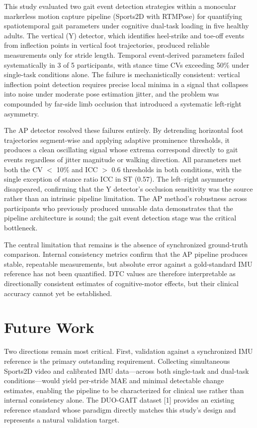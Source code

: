 \documentclass[conference]{IEEEtran}
\begin{document}
This study evaluated two gait event detection strategies within a monocular markerless motion capture pipeline (Sports2D with RTMPose) for quantifying spatiotemporal gait parameters under cognitive dual-task loading in five healthy adults. The vertical (Y) detector, which identifies heel-strike and toe-off events from inflection points in vertical foot trajectories, produced reliable measurements only for stride length. Temporal event-derived parameters failed systematically in 3 of 5 participants, with stance time CVs exceeding 50\% under single-task conditions alone. The failure is mechanistically consistent: vertical inflection point detection requires precise local minima in a signal that collapses into noise under moderate pose estimation jitter, and the problem was compounded by far-side limb occlusion that introduced a systematic left-right asymmetry.

The AP detector resolved these failures entirely. By detrending horizontal foot trajectories segment-wise and applying adaptive prominence thresholds, it produces a clean oscillating signal whose extrema correspond directly to gait events regardless of jitter magnitude or walking direction. All parameters met both the CV $<$ 10\% and ICC $>$ 0.6 thresholds in both conditions, with the single exception of stance ratio ICC in ST (0.57). The left–right asymmetry disappeared, confirming that the Y detector's occlusion sensitivity was the source rather than an intrinsic pipeline limitation. The AP method's robustness across participants who previously produced unusable data demonstrates that the pipeline architecture is sound; the gait event detection stage was the critical bottleneck.

The central limitation that remains is the absence of synchronized ground-truth comparison. Internal consistency metrics confirm that the AP pipeline produces stable, repeatable measurements, but absolute error against a gold-standard IMU reference has not been quantified. DTC values are therefore interpretable as directionally consistent estimates of cognitive-motor effects, but their clinical accuracy cannot yet be established.

\section{Future Work}

Two directions remain most critical. First, validation against a synchronized IMU reference is the primary outstanding requirement. Collecting simultaneous Sports2D video and calibrated IMU data—across both single-task and dual-task conditions—would yield per-stride MAE and minimal detectable change estimates, enabling the pipeline to be characterized for clinical use rather than internal consistency alone. The DUO-GAIT dataset [1] provides an existing reference standard whose paradigm directly matches this study's design and represents a natural validation target.
\end{document}

